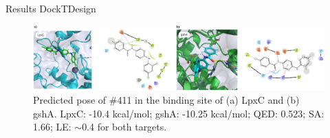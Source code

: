 \documentclass[aspectratio=169,xcolor=dvipsnames]{beamer}
\begin{document}






\begin{frame}{Results \hfill {\footnotesize \alert{DockTDesign}}}
    \begin{figure}
        \centering
        \includegraphics[width=1\textwidth]{imgs/results/lpxc-gsha-411-cmpd.png}
        \caption{Predicted pose of \#411 in the binding site of (a) LpxC and (b) gshA. LpxC: -10.4 kcal/mol; gshA: -10.25 kcal/mol; QED: 0.523; SA: 1.66; LE: $\sim$0.4 for both targets.}
    \end{figure}
\end{frame}
\end{document}
